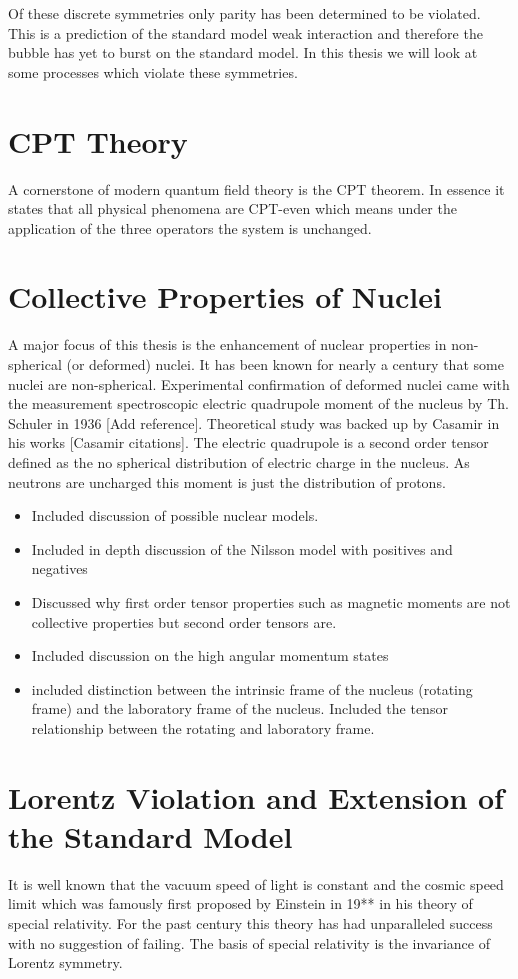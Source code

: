 \documentclass[10pt,a4paper, twoside]{report}
\begin{document}
Of these discrete symmetries only parity has been determined to be violated. This is a prediction of the standard model weak interaction and therefore the bubble has yet to burst on the standard model. In this thesis we will look at some processes which violate these symmetries. 
\section{CPT Theory}
A cornerstone of modern quantum field theory is the CPT theorem. In essence it states that all physical phenomena are CPT-even which means under the application of the three operators the system is unchanged. \cite{LandauVol4}
\section{Collective Properties of Nuclei}
A major focus of this thesis is the enhancement of nuclear properties in non-spherical (or deformed) nuclei. It has been known for nearly a century that some nuclei are non-spherical.  Experimental confirmation of deformed nuclei came with the measurement spectroscopic electric quadrupole moment of the nucleus by Th. Schuler in 1936 [Add reference]. Theoretical study was backed up by Casamir in his works [Casamir citations]. The electric quadrupole is a second order tensor defined as the no spherical distribution of electric charge in the nucleus. As neutrons are uncharged this moment is just the distribution of protons. 
\begin{itemize}
\item Included discussion of possible nuclear models.
\item Included in depth discussion of the Nilsson model with positives and negatives
\item Discussed why first order tensor properties such as magnetic moments are not collective properties but second order tensors are.
\item Included discussion on the high angular momentum states
\item included distinction between the intrinsic frame of the nucleus (rotating frame) and the laboratory frame of the nucleus. Included the tensor relationship between the rotating and laboratory frame.
\end{itemize}
\section{Lorentz Violation and Extension of the Standard Model}
It is well known that the vacuum speed of light is constant and the cosmic speed limit which was famously first proposed by Einstein in 19** in his theory of special relativity. For the past century this theory has had unparalleled success with no suggestion of failing. The basis of special relativity is the invariance of Lorentz symmetry. \\
\end{document}

